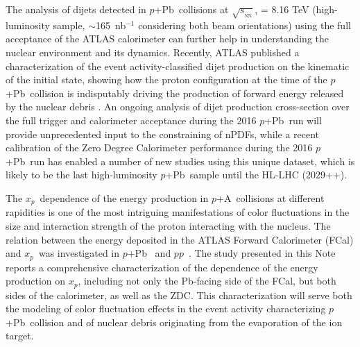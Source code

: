 \documentclass[NOTE, atlasdraft=true, texlive=2020, UKenglish]{atlasdoc}
\newcommand{\xp}{$x_{p}$}
\newcommand{\SNN}{\ensuremath{\sqrt{s_{_\text{NN}}}}}
\newcommand{\pxp}{$pp$}
\newcommand{\pxA}{$p$+A}
\newcommand{\pxPb}{$p$+Pb}
\begin{document}
The analysis of dijets detected in \pxPb\ collisions at \SNN, = 8.16 TeV (high-luminosity sample, $\sim$165~nb$^{-1}$ considering both beam orientations) using the full acceptance of the ATLAS calorimeter can further help in understanding the nuclear environment and its dynamics. Recently, ATLAS published a characterization of the event activity-classified dijet production on the kinematic of the initial state, showing how the proton configuration at the time of the \pxPb\ collision is indisputably driving the production of forward energy released by the nuclear debris \cite{ATLAS:2023zfx}.  An ongoing analysis of dijet production cross-section over the full trigger and calorimeter acceptance during the 2016 \pxPb\ run will provide unprecedented input to the constraining of nPDFs, while a recent calibration of the Zero Degree Calorimeter performance during the 2016 \pxPb\ run \cite{Hoppesch:2900504} has enabled a number of new studies using this unique dataset, which is likely to be the last high-luminosity \pxPb\ sample until the HL-LHC (2029++). 

The \xp\ dependence of the energy production in \pxA\ collisions at different rapidities is one of the most intriguing manifestations of color fluctuations in the size and interaction strength of the proton interacting with the nucleus. The relation between the energy deposited in the ATLAS Forward Calorimeter (FCal) and \xp\ was investigated in \pxPb\ \cite{ATLAS:2014cpa} and \pxp\ \cite{HION-2015-02}. The study presented in this Note reports a comprehensive characterization of the dependence of the energy production on \xp, including not only the Pb-facing side of the FCal, but both sides of the calorimeter, as well as the ZDC. This characterization will serve both the modeling of color fluctuation effects in the event activity characterizing \pxPb\ collision and of nuclear debris originating from the evaporation of the ion target. 
\end{document}
